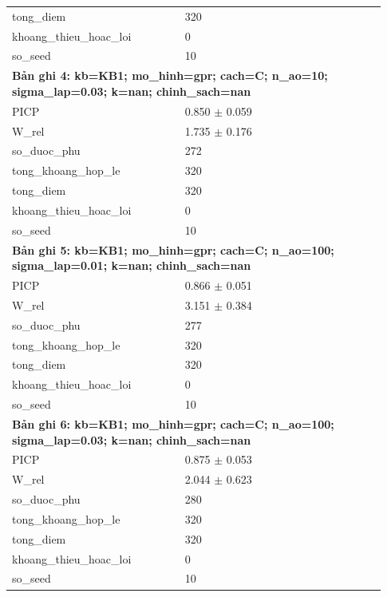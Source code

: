 \begin{longtable}{p{0.43\linewidth}p{0.50\linewidth}}
tong\_\allowbreak diem & 320 \\
khoang\_\allowbreak thieu\_\allowbreak hoac\_\allowbreak loi & 0 \\
so\_\allowbreak seed & 10 \\
\midrule
\multicolumn{2}{p{0.95\linewidth}}{\textbf{Bản ghi 4: kb=KB1; mo\_hinh=gpr; cach=C; n\_ao=10; sigma\_lap=0.03; k=nan; chinh\_sach=nan}} \\
PICP & 0.850 $\pm$ 0.059 \\
W\_\allowbreak rel & 1.735 $\pm$ 0.176 \\
so\_\allowbreak duoc\_\allowbreak phu & 272 \\
tong\_\allowbreak khoang\_\allowbreak hop\_\allowbreak le & 320 \\
tong\_\allowbreak diem & 320 \\
khoang\_\allowbreak thieu\_\allowbreak hoac\_\allowbreak loi & 0 \\
so\_\allowbreak seed & 10 \\
\midrule
\multicolumn{2}{p{0.95\linewidth}}{\textbf{Bản ghi 5: kb=KB1; mo\_hinh=gpr; cach=C; n\_ao=100; sigma\_lap=0.01; k=nan; chinh\_sach=nan}} \\
PICP & 0.866 $\pm$ 0.051 \\
W\_\allowbreak rel & 3.151 $\pm$ 0.384 \\
so\_\allowbreak duoc\_\allowbreak phu & 277 \\
tong\_\allowbreak khoang\_\allowbreak hop\_\allowbreak le & 320 \\
tong\_\allowbreak diem & 320 \\
khoang\_\allowbreak thieu\_\allowbreak hoac\_\allowbreak loi & 0 \\
so\_\allowbreak seed & 10 \\
\midrule
\multicolumn{2}{p{0.95\linewidth}}{\textbf{Bản ghi 6: kb=KB1; mo\_hinh=gpr; cach=C; n\_ao=100; sigma\_lap=0.03; k=nan; chinh\_sach=nan}} \\
PICP & 0.875 $\pm$ 0.053 \\
W\_\allowbreak rel & 2.044 $\pm$ 0.623 \\
so\_\allowbreak duoc\_\allowbreak phu & 280 \\
tong\_\allowbreak khoang\_\allowbreak hop\_\allowbreak le & 320 \\
tong\_\allowbreak diem & 320 \\
khoang\_\allowbreak thieu\_\allowbreak hoac\_\allowbreak loi & 0 \\
so\_\allowbreak seed & 10 \\
\midrule

\end{longtable}
